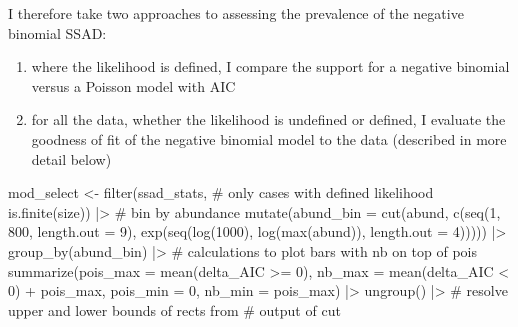 \documentclass[
  letterpaper,
  DIV=11,
  numbers=noendperiod]{scrartcl}
\newenvironment{Shaded}{\begin{snugshade}}{\end{snugshade}}
\newcommand{\AttributeTok}[1]{\textcolor[rgb]{0.40,0.45,0.13}{#1}}
\newcommand{\CommentTok}[1]{\textcolor[rgb]{0.37,0.37,0.37}{#1}}
\newcommand{\DecValTok}[1]{\textcolor[rgb]{0.68,0.00,0.00}{#1}}
\newcommand{\FunctionTok}[1]{\textcolor[rgb]{0.28,0.35,0.67}{#1}}
\newcommand{\NormalTok}[1]{\textcolor[rgb]{0.00,0.23,0.31}{#1}}
\newcommand{\OtherTok}[1]{\textcolor[rgb]{0.00,0.23,0.31}{#1}}
\newcommand{\SpecialCharTok}[1]{\textcolor[rgb]{0.37,0.37,0.37}{#1}}
\providecommand{\tightlist}{%
  \setlength{\itemsep}{0pt}\setlength{\parskip}{0pt}}
\begin{document}
I therefore take two approaches to assessing the prevalence of the
negative binomial SSAD:

\begin{enumerate}
\def\labelenumi{\arabic{enumi}.}
\tightlist
\item
  where the likelihood is defined, I compare the support for a negative
  binomial versus a Poisson model with AIC
\item
  for all the data, whether the likelihood is undefined or defined, I
  evaluate the goodness of fit of the negative binomial model to the
  data (described in more detail below)
\end{enumerate}

\begin{Shaded}
\begin{Highlighting}[]
\NormalTok{mod\_select }\OtherTok{\textless{}{-}} \FunctionTok{filter}\NormalTok{(ssad\_stats, }
                     \CommentTok{\# only cases with defined likelihood}
                     \FunctionTok{is.finite}\NormalTok{(size)) }\SpecialCharTok{|\textgreater{}} 
    \CommentTok{\# bin by abundance}
    \FunctionTok{mutate}\NormalTok{(}\AttributeTok{abund\_bin =} \FunctionTok{cut}\NormalTok{(abund, }\FunctionTok{c}\NormalTok{(}\FunctionTok{seq}\NormalTok{(}\DecValTok{1}\NormalTok{, }\DecValTok{800}\NormalTok{, }\AttributeTok{length.out =} \DecValTok{9}\NormalTok{), }
                                    \FunctionTok{exp}\NormalTok{(}\FunctionTok{seq}\NormalTok{(}\FunctionTok{log}\NormalTok{(}\DecValTok{1000}\NormalTok{), }\FunctionTok{log}\NormalTok{(}\FunctionTok{max}\NormalTok{(abund)), }
                                        \AttributeTok{length.out =} \DecValTok{4}\NormalTok{))))) }\SpecialCharTok{|\textgreater{}} 
    \FunctionTok{group\_by}\NormalTok{(abund\_bin) }\SpecialCharTok{|\textgreater{}} 
    \CommentTok{\# calculations to plot bars with nb on top of pois}
    \FunctionTok{summarize}\NormalTok{(}\AttributeTok{pois\_max =} \FunctionTok{mean}\NormalTok{(delta\_AIC }\SpecialCharTok{\textgreater{}=} \DecValTok{0}\NormalTok{),}
              \AttributeTok{nb\_max =} \FunctionTok{mean}\NormalTok{(delta\_AIC }\SpecialCharTok{\textless{}} \DecValTok{0}\NormalTok{) }\SpecialCharTok{+}\NormalTok{ pois\_max, }
              \AttributeTok{pois\_min =} \DecValTok{0}\NormalTok{, }
              \AttributeTok{nb\_min =}\NormalTok{ pois\_max) }\SpecialCharTok{|\textgreater{}} 
    \FunctionTok{ungroup}\NormalTok{() }\SpecialCharTok{|\textgreater{}} 
    \CommentTok{\# resolve upper and lower bounds of rects from}
    \CommentTok{\# output of \textasciigrave{}cut\textasciigrave{}}

\end{Highlighting}
\end{Shaded}
\end{document}
